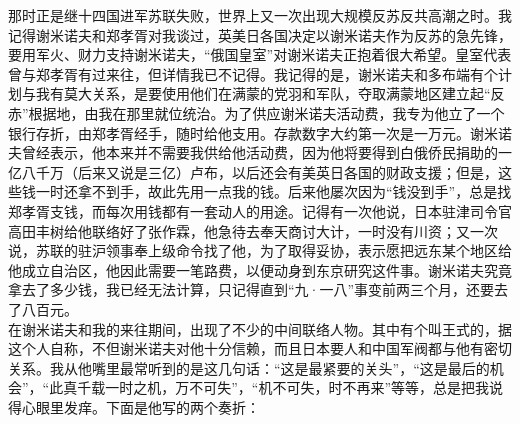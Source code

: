 那时正是继十四国进军苏联失败，世界上又一次出现大规模反苏反共高潮之时。我记得谢米诺夫和郑孝胥对我谈过，英美日各国决定以谢米诺夫作为反苏的急先锋，要用军火、财力支持谢米诺夫，“俄国皇室”对谢米诺夫正抱着很大希望。皇室代表曾与郑孝胥有过来往，但详情我已不记得。我记得的是，谢米诺夫和多布端有个计划与我有莫大关系，是要使用他们在满蒙的党羽和军队，夺取满蒙地区建立起“反赤”根据地，由我在那里就位统治。为了供应谢米诺夫活动费，我专为他立了一个银行存折，由郑孝胥经手，随时给他支用。存款数字大约第一次是一万元。谢米诺夫曾经表示，他本来并不需要我供给他活动费，因为他将要得到白俄侨民捐助的一亿八千万（后来又说是三亿）卢布，以后还会有美英日各国的财政支援；但是，这些钱一时还拿不到手，故此先用一点我的钱。后来他屡次因为“钱没到手”，总是找郑孝胥支钱，而每次用钱都有一套动人的用途。记得有一次他说，日本驻津司令官高田丰树给他联络好了张作霖，他急待去奉天商讨大计，一时没有川资；又一次说，苏联的驻沪领事奉上级命令找了他，为了取得妥协，表示愿把远东某个地区给他成立自治区，他因此需要一笔路费，以便动身到东京研究这件事。谢米诺夫究竟拿去了多少钱，我已经无法计算，只记得直到“九·一八”事变前两三个月，还要去了八百元。\\

在谢米诺夫和我的来往期间，出现了不少的中间联络人物。其中有个叫王式的，据这个人自称，不但谢米诺夫对他十分信赖，而且日本要人和中国军阀都与他有密切关系。我从他嘴里最常听到的是这几句话：“这是最紧要的关头”，“这是最后的机会”，“此真千载一时之机，万不可失”，“机不可失，时不再来”等等，总是把我说得心眼里发痒。下面是他写的两个奏折：\\

